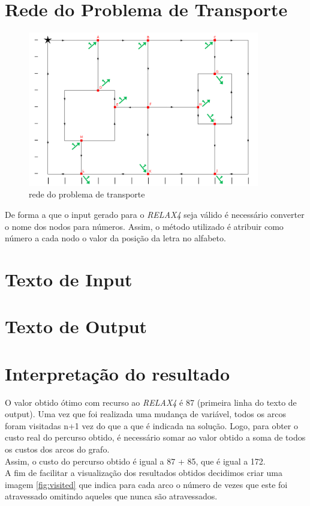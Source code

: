 \documentclass[a4paper]{report}
\begin{document}
\pagebreak
\section{Rede do Problema de Transporte}

\begin{figure}[H]
    \begin{center}
        \includegraphics[width=0.9\textwidth]{images/redeTransporte.png}\par
        \caption{rede do problema de transporte}
        \label{fig:redeTransporte}
    \end{center}
\end{figure}
De forma a que o input gerado para o \textit{RELAX4} seja válido é necessário
converter o nome dos nodos para números. Assim, o método utilizado é atribuir
como número a cada nodo o valor da posição da letra no alfabeto.

\pagebreak
\section{Texto de Input}
\label{input}


\pagebreak
\section{Texto de Output}
\label{output}


\pagebreak
\section{Interpretação do resultado}
\label{solution}
O valor obtido ótimo com recurso ao \textit{RELAX4} é 87 (primeira linha do
texto de output). Uma vez que foi realizada uma mudança de variável, todos os
arcos foram visitadas n+1 vez do que a que é indicada na solução. Logo, para
obter o custo real do percurso obtido, é necessário somar ao valor obtido a soma
de todos os custos dos arcos do grafo.\\
Assim, o custo do percurso obtido é igual a 87 + 85, que é igual a 172.\\
A fim de facilitar a visualização dos resultados obtidos decidimos criar uma
imagem \ref{fig:visited} que indica para cada arco o número de vezes que este
foi atravessado omitindo aqueles que nunca são atravessados.
\end{document}
